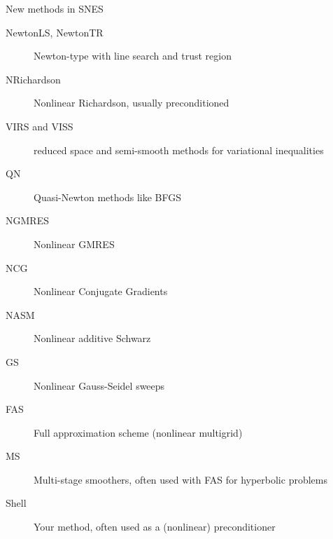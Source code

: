 \begin{frame}{New methods in SNES}
  \begin{description}
  \item[NewtonLS, NewtonTR] Newton-type with line search and trust region
  \item[NRichardson] Nonlinear Richardson, usually preconditioned
  \item[VIRS and VISS] reduced space and semi-smooth methods for variational inequalities
  \item[QN] Quasi-Newton methods like BFGS
  \item[NGMRES] Nonlinear GMRES
  \item[NCG] Nonlinear Conjugate Gradients
  \item[NASM] Nonlinear additive Schwarz
  \item[GS] Nonlinear Gauss-Seidel sweeps
  \item[FAS] Full approximation scheme (nonlinear multigrid)
  \item[MS] Multi-stage smoothers, often used with FAS for hyperbolic problems
  \item[Shell] Your method, often used as a (nonlinear) preconditioner
  \end{description}
\end{frame}
